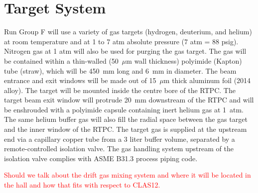 \section{Target System}

Run Group F will use a variety of gas targets (hydrogen, deuterium, and helium) 
at room temperature and at 1 to 7 atm absolute pressure (7 atm = 88 psig).  
Nitrogen gas at 1 atm will also be used for purging the gas target. The gas 
will be contained within a thin-walled (50~$\mu$m wall thickness) polyimide 
(Kapton) tube (straw), which will be 450~mm long and 6~mm in diameter. The beam 
entrance and exit windows will be made out of 15~$\mu$m thick aluminum foil 
(2014 alloy). The target will be mounted inside the centre bore of the RTPC.  
The target beam exit window will protrude 20~mm downstream of the RTPC and will 
be enshrouded with a polyimide capsule containing inert helium gas at 1~atm.
The same helium buffer gas will also fill the radial space between the gas 
target and the inner window of the RTPC. The target gas is supplied at the 
upstream end via a capillary copper tube from a 3 liter buffer volume, 
separated by a remote-controlled isolation valve. The gas handling system 
upstream of the isolation valve complies with ASME B31.3 process piping code.


\textcolor{red}{Should we talk about the drift gas mixing system and where it 
will be located in the hall and how that fits with respect to CLAS12.}

%   
               
